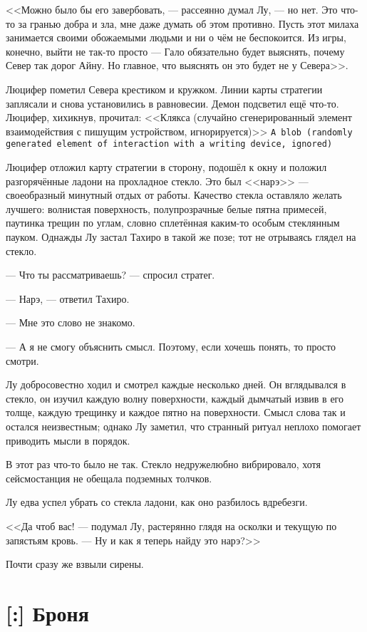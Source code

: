 <<Можно было бы его завербовать, --- рассеянно думал Лу, --- но нет.
Это что-то за гранью добра и зла, мне даже думать об этом противно.
Пусть этот милаха занимается своими обожаемыми людьми и ни о чём не беспокоится.
Из игры, конечно, выйти не так-то просто --- Гало обязательно будет выяснять, почему Север так дорог Айну.
Но главное, что выяснять он это будет не у Севера>>.

Люцифер пометил Севера крестиком и кружком.
Линии карты стратегии заплясали и снова установились в равновесии.
Демон подсветил ещё что-то.
Люцифер, хихикнув, прочитал:
{<<Клякса (случайно сгенерированный элемент взаимодействия с пишущим устройством, игнорируется)>>}
{\texttt{A blob (randomly generated element of interaction with a writing device, ignored)}}

Люцифер отложил карту стратегии в сторону, подошёл к окну и положил разгорячённые ладони на прохладное стекло.
Это был <<нарэ>> --- своеобразный минутный отдых от работы.
Качество стекла оставляло желать лучшего: волнистая поверхность, полупрозрачные белые пятна примесей, паутинка трещин по углам, словно сплетённая каким-то особым стеклянным пауком.
Однажды Лу застал Тахиро в такой же позе;
тот не отрываясь глядел на стекло.

--- Что ты рассматриваешь? --- спросил стратег.

--- Нарэ, --- ответил Тахиро.

--- Мне это слово не знакомо.

--- А я не смогу объяснить смысл.
Поэтому, если хочешь понять, то просто смотри.

Лу добросовестно ходил и смотрел каждые несколько дней.
Он вглядывался в стекло, он изучил каждую волну поверхности, каждый дымчатый извив в его толще, каждую трещинку и каждое пятно на поверхности.
Смысл слова так и остался неизвестным;
однако Лу заметил, что странный ритуал неплохо помогает приводить мысли в порядок.

В этот раз что-то было не так.
Стекло недружелюбно вибрировало, хотя сейсмостанция не обещала подземных толчков.

Лу едва успел убрать со стекла ладони, как оно разбилось вдребезги.

<<Да чтоб вас! --- подумал Лу, растерянно глядя на осколки и текущую по запястьям кровь. --- Ну и как я теперь найду это нарэ?>>

Почти сразу же взвыли сирены.

\section{[:] Броня}

